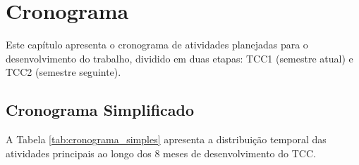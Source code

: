 \chapter{Cronograma}
\label{cap:cronograma}

Este capítulo apresenta o cronograma de atividades planejadas para o desenvolvimento do trabalho, dividido em duas etapas: TCC1 (semestre atual) e TCC2 (semestre seguinte).

\section{Cronograma Simplificado}

A Tabela \ref{tab:cronograma_simples} apresenta a distribuição temporal das atividades principais ao longo dos 8 meses de desenvolvimento do TCC.

